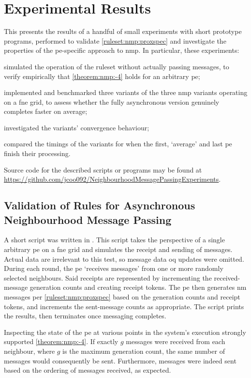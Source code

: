 \section{\label{sec:nmp:experiments}Experimental Results}

This  presents the results of a handful of small experiments with short prototype programs, performed to validate \cref{ruleset:nmp:proxspec} and investigate the properties of the \gls{pe}-specific approach to \gls{nmp}.  In particular, these experiments:
\begin{inparaenum}[(i)]
\item simulated the operation of the \gls{ruleset} without actually passing messages, to verify empirically that \cref{theorem:nmp:-4} holds for an arbitrary \gls{pe};
\item implemented and benchmarked three variants of the three \gls{nmp} variants operating on a \gls{fne} grid, to assess whether the fully asynchronous version genuinely completes faster on average;
\item investigated the variants' convergence behaviour;
\item compared the timings of the variants for when the first, `average' and last \gls{pe} finish their processing.
\end{inparaenum}
Source code for the described scripts or programs may be found at \url{https://github.com/jcoo092/NeighbourhoodMessagePassingExperiments}.

\subsection{Validation of Rules for Asynchronous Neighbourhood Message Passing}
A short script was written in \fsharp{}.  This script takes the perspective of a single arbitrary \gls{pe} on a \gls{fne} grid and simulates the receipt and sending of messages.  Actual data are irrelevant to this test, so message data \gls{oq} updates were omitted.  During each round, the \gls{pe} `receives messages' from one or more randomly selected neighbours.  Said receipts are represented by incrementing the received-message generation counts and creating receipt tokens.  The \gls{pe} then generates \gls{nm} messages per \cref{ruleset:nmp:proxspec} based on the generation counts and receipt tokens, and increments the sent-message counts as appropriate.  The script prints the results, then terminates once messaging completes.

Inspecting the state of the \gls{pe} at various points in the system's execution strongly supported \cref{theorem:nmp:-4}.  If exactly \(g\) messages were received from each neighbour, where \(g\) is the maximum generation count, the same number of messages would consequently be sent.  Furthermore, messages were indeed sent based on the ordering of messages received, as expected.

